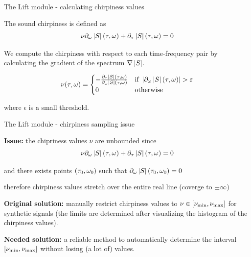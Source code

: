 \documentclass[10pt,american,ignorenonframetext,aspectratio=1610]{beamer}
\theoremstyle{remark}
\begin{document}
\begin{frame}{The Lift module - calculating chirpiness values}
\protect\hypertarget{the-lift-module---calculating-chirpiness-values}{}

The sound chirpiness is defined as
\[\nu\partial_\omega\left\lvert S\right\rvert(\tau,\omega) + \partial_\tau\left\lvert S\right\rvert(\tau,\omega)=0\]

We compute the chirpiness with respect to each time-frequency pair by
calculating the gradient of the spectrum \(\nabla\left\lvert S\right\rvert\).

\[\nu(\tau,\omega) =
\begin{cases}
-\frac{\partial_\tau\left\lvert S\right\rvert(\tau,\omega)}{\partial_\omega\left\lvert S\right\rvert(\tau,\omega)} & \text{if}~\left\lvert\partial_\omega\left\lvert S\right\rvert(\tau,\omega)\right\rvert>\varepsilon\\
0 & \text{otherwise}
\end{cases}\]

where \(\epsilon\) is a small threshold.

\end{frame}

\begin{frame}{The Lift module - chirpiness sampling issue}
\protect\hypertarget{the-lift-module---chirpiness-sampling-issue}{}

\textbf{Issue:} the chipriness values \(\nu\) are unbounded since
\[\nu\partial_\omega\left\lvert S\right\rvert(\tau,\omega) + \partial_\tau\left\lvert S\right\rvert(\tau,\omega)=0\]

and there exists points \((\tau_0,\omega_0)\) such that
\(\partial_\omega\left\lvert S\right\rvert(\tau_0,\omega_0)=0\)

therefore chirpiness values stretch over the entire real line (coverge
to \(\pm\infty\))

\textbf{Original solution:} manually restrict chirpiness values to
\(\nu\in[\nu_{\min},\nu_{\max}]\) for synthetic signals (the limits are
determined after visualizing the histogram of the chirpiness values).

\textbf{Needed solution:} a reliable method to automatically determine
the interval \([\nu_{\min},\nu_{\max}]\) without losing (a lot of) values.

\end{frame}
\end{document}
